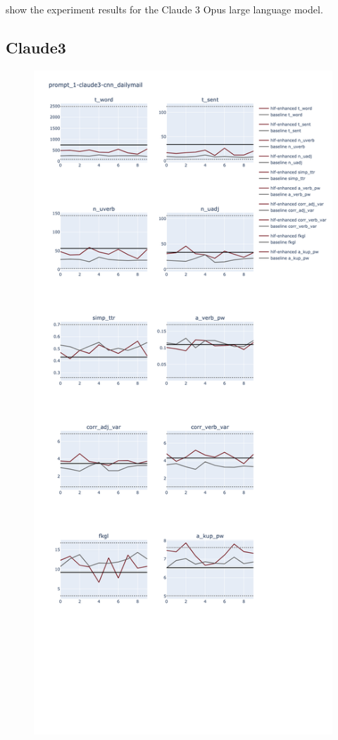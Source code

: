 \documentclass[11pt]{article}
\begin{document}
show the experiment results for the Claude 3 Opus large language model.

\subsection{Claude3}

\begin{figure}[ht]
    \includegraphics[width=\textwidth,height=0.9\textheight,scale=1]{plots/prompt_1/prompt_1-claude3-cnn_dailymail/prompt_1-claude3-cnn_dailymail.png}

\end{figure}
\end{document}
